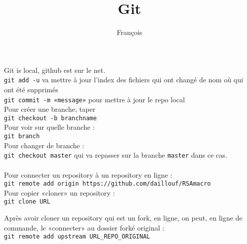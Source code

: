 \documentclass{article}
\begin{document}
\title{Git}

\author{François}
\maketitle

Git is local, github est sur le net.\\
\verb!git add -u! va mettre à jour l'index des fichiers qui ont changé de nom où qui ont été supprimés \\
\verb!git commit -m «message»! pour mettre à jour le repo local \\
Pour créer une branche, taper \\
\verb!git checkout -b branchname!\\
Pour voir sur quelle branche :\\
\verb!git branch!\\
Pour changer de branche :\\
\verb!git checkout master! qui va repasser sur la branche \verb!master! dans ce cas.\\
\\
Pour connecter un repository à un repository en ligne :\\
\verb!git remote add origin https://github.com/daillouf/RSAmacro!\\

Pour copier «cloner» un repository :\\
\verb!git clone URL!

Après avoir cloner un repository qui est un fork, en ligne, on peut, en ligne de commande, le «connecter» au dossier forké original : \\
\verb!git remote add upstream URL_REPO_ORIGINAL!\\
\end{document}
